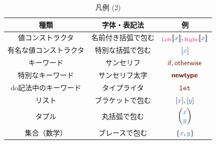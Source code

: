 \documentclass[a5paper,twoside,fleqn,draft]{jsbook}
\begin{document}
\begin{table}[p]
\caption{凡例 (2)}
\begin{center}
\begin{tabular}{||c|c|c||}
\hline
種類&字体・表記法&例\\
\hline\hline
値コンストラクタ&名前付き括弧で包む&$\hLeftWith{\hVar{x}},\hRightWith{\hVar{x}}$\\
有名な値コンストラクタ&特別な括弧で包む&$\hListWith{\hVar{x}}$\\
\hline
キーワード&サンセリフ&$\hIf,\hOtherwise$\\
特別なキーワード&サンセリフ太字&$\hNewtype$\\
do記法中のキーワード&タイプライタ&$\hDoLet$\\
\hline
リスト&ブラケットで包む&$\hListWith{\hVar{x}},\hListWith{\hVar{y}}$\\
タプル&丸括弧で包む&$\hPairWith{\hVar{x}}{\hVar{y}}$\\
\hline
集合（数学）&ブレースで包む&$\{\hVar{x},\hVar{y}\}$\\
\hline
\end{tabular}
\end{center}
\end{table}
\end{document}
